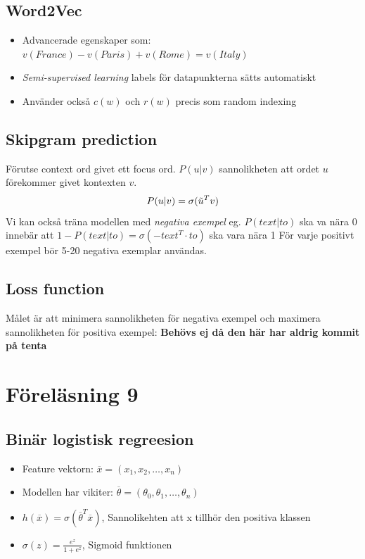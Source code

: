 \documentclass[12pt,a4paper]{article}
\begin{document}
\newpage
\subsection*{Word2Vec}
\begin{itemize}
    \item Advancerade egenskaper som:  $v(France) -v(Paris) +v(Rome) = v(Italy)$
    \item \textit{Semi-supervised learning} labels för datapunkterna sätts automatiskt
    \item Använder också $c(w)$ och $r(w)$ precis som random indexing
\end{itemize}

\subsection*{Skipgram prediction}
Förutse context ord givet ett focus ord. $P(u|v)$ sannolikheten att ordet $u$ förekommer givet kontexten $v$.
{\large $$P(u|v) = \sigma(\Tilde{u}^Tv)$$}
Vi kan också träna modellen med \textit{negativa exempel} eg. $P(text|to)$ ska va nära 0 innebär att $1 - P(text|to) = {\sigma(-text^T \cdot to )}$ ska vara nära 1
För varje positivt exempel bör 5-20 negativa exemplar användas. 

\subsection*{Loss function}
Målet är att minimera sannolikheten för negativa exempel och maximera sannolikheten för positiva exempel:
{\large \textbf{Behövs ej då den här har aldrig kommit på tenta}}

\newpage

\section*{Föreläsning 9} 
\subsection*{Binär logistisk regreesion}
\begin{itemize}
    \item Feature vektorn: $\overline{x} = (x_1, x_2, \dots, x_n)$
    \item Modellen har vikiter: $\overline{\theta} = (\theta_0, \theta_1, \dots, \theta_n)$
    \item $h(\overline{x}) = \sigma(\overline{\theta}^T \overline{x})$, Sannolikehten att x tillhör den positiva klassen
    \item $\sigma(z) = \frac{e^z}{1+e^z}$, Sigmoid funktionen
\end{itemize}
\end{document}
